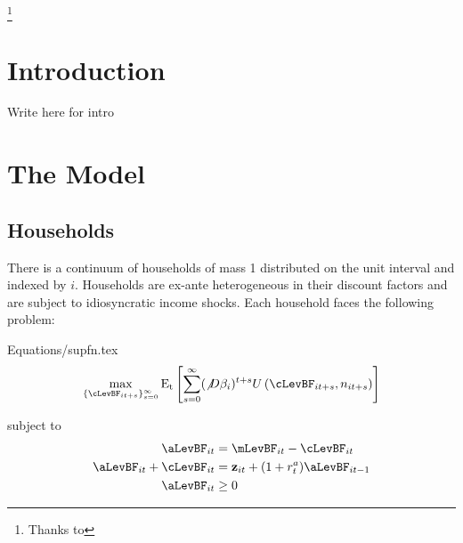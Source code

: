 \documentclass[titlepage]{\econtex}\providecommand{\texname}{BufferStockTheory}
\providecommand{\EqDir}{Equations}
\begin{document}
\begin{authorsinfo}
\end{authorsinfo}

\thanks{Thanks to }

\titlepagefinish


\newtheorem{defn}{Definition}
\newtheorem{theorem}{Theorem}

\hypertarget{Introduction}{}
\section{Introduction}

\label{sec:intro}


Write here for intro



\hypertarget{The-Model}{}
\section{The Model}

\subsection{Households}
\label{subsec:Households} 

There is a continuum of households of mass 1 distributed on the unit
interval and indexed by $i$. Households are ex-ante heterogeneous in their discount factors and are subject to idiosyncratic income shocks.  Each household faces the following problem:

\begin{verbatimwrite}{\EqDir/supfn.tex}
\begin{eqnarray}
  \label{eq:supfn}
  \max_{\{\cLevBF_{it+s}\}_{s=0}^{\infty}} \mathrm{E_{t}}\left[\sum_{s=0}^{\infty} (\not D \beta_{i})^{t+s} U\left(  \cLevBF_{i t+s}, n_{i t+s}\right)\right]
\end{eqnarray}
\end{verbatimwrite}
 

subject to 
\begin{align*}
\aLevBF_{it}     &= \mLevBF_{it} - \cLevBF_{it}   \label{eq:DBCparts} \\
\aLevBF_{it} +\cLevBF_{it}    &= \mathbf{z}_{it} +   (1 + r^{a}_{t} ) \aLevBF_{it-1}   \\ 
\aLevBF_{it}  &\geq 0 \\
\end{align*}
\end{document}
